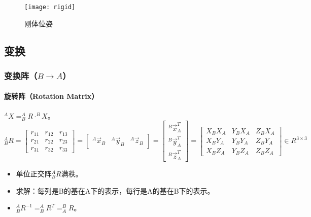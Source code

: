 \documentclass[
12pt, %
a4paper, 
oneside, %
headinclude,footinclude, %
]{scrartcl}
\begin{document}
\begin{figure}[H]
\centering 
\texttt{[image: rigid]} 
\caption[刚体位姿]{刚体位姿}
\end{figure}
\subsection[变换]{变换}
\subsubsection[变换阵]{变换阵（$ B \to A $）}
\paragraph{旋转阵（Rotation Matrix）}
$ ^A X = ^A_B R \cdot ^B X $。
$$ 
^A_B R 
= \begin{bmatrix} r_{11} & r_{12} & r_{13} \\ r_{21} & r_{22} & r_{23} \\ r_{31} & r_{32} & r_{33} \end{bmatrix}
= \begin{bmatrix} ^A \vec x_B & ^A \vec y_B & ^A \vec z_B \end{bmatrix}
= \begin{bmatrix} ^B \vec x_A^T \\ ^B \vec y_A^T \\ ^B \vec z_A^T \end{bmatrix}
= \begin{bmatrix} X_BX_A & Y_BX_A & Z_BX_A \\ X_BY_A & Y_BY_A & Z_BY_A \\ X_BZ_A & Y_BZ_A & Z_BZ_A \end{bmatrix}
\in R^{3 \times 3}
$$
\begin{itemize}
\item 单位正交阵$ ^A_B R $满秩。
\item 求解：每列是B的基在A下的表示，每行是A的基在B下的表示。
\item $ ^A_B R^{-1} = ^A_B R^T = ^B_A R $。
\end{itemize}
\end{document}
